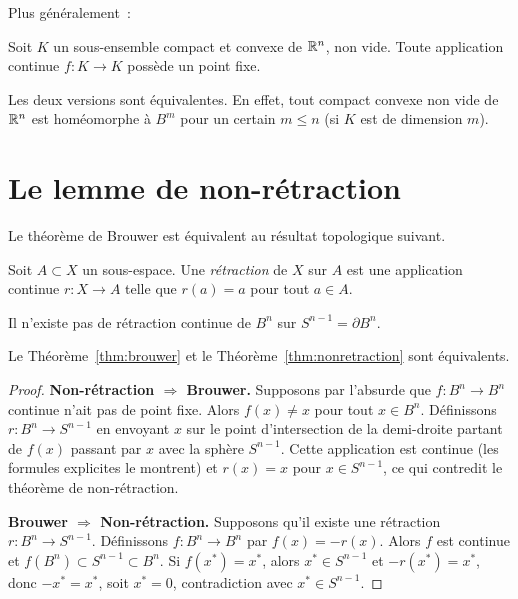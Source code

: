 Plus g\'en\'eralement~:

\begin{theoreme}
Soit $K$ un sous-ensemble compact et convexe de $\mathbb{R}^n$, non vide. Toute
application continue $f : K \to K$ poss\`ede un point fixe.
\end{theoreme}

\begin{remarque}
Les deux versions sont \'equivalentes. En effet, tout compact convexe non vide
de $\mathbb{R}^n$ est hom\'eomorphe \`a $B^m$ pour un certain $m \leq n$ (si $K$ est de
dimension $m$).
\end{remarque}

\section{Le lemme de non-r\'etraction}

Le th\'eor\`eme de Brouwer est \'equivalent au r\'esultat topologique suivant.

\begin{definition}[R\'etraction]
Soit $A \subset X$ un sous-espace. Une \emph{r\'etraction} de $X$ sur $A$ est
une application continue $r : X \to A$ telle que $r(a) = a$ pour tout $a \in A$.
\end{definition}

\begin{theoreme}\label{thm:nonretraction}
Il n'existe pas de r\'etraction continue de $B^n$ sur $S^{n-1} = \partial B^n$.
\end{theoreme}

\begin{proposition}
Le Th\'eor\`eme~\ref{thm:brouwer} et le Th\'eor\`eme~\ref{thm:nonretraction} sont
\'equivalents.
\end{proposition}

\begin{proof}
\textbf{Non-r\'etraction $\Rightarrow$ Brouwer.}
Supposons par l'absurde que $f : B^n \to B^n$ continue n'ait pas de point fixe.
Alors $f(x) \neq x$ pour tout $x \in B^n$. D\'efinissons $r : B^n \to S^{n-1}$
en envoyant $x$ sur le point d'intersection de la demi-droite partant de $f(x)$
passant par $x$ avec la sph\`ere $S^{n-1}$. Cette application est continue (les
formules explicites le montrent) et $r(x) = x$ pour $x \in S^{n-1}$, ce qui
contredit le th\'eor\`eme de non-r\'etraction.

\textbf{Brouwer $\Rightarrow$ Non-r\'etraction.}
Supposons qu'il existe une r\'etraction $r : B^n \to S^{n-1}$.
D\'efinissons $f : B^n \to B^n$ par $f(x) = -r(x)$. Alors $f$ est continue et
$f(B^n) \subset S^{n-1} \subset B^n$. Si $f(x^*) = x^*$, alors
$x^* \in S^{n-1}$ et $-r(x^*) = x^*$, donc $-x^* = x^*$, soit $x^* = 0$,
contradiction avec $x^* \in S^{n-1}$.
\end{proof}

